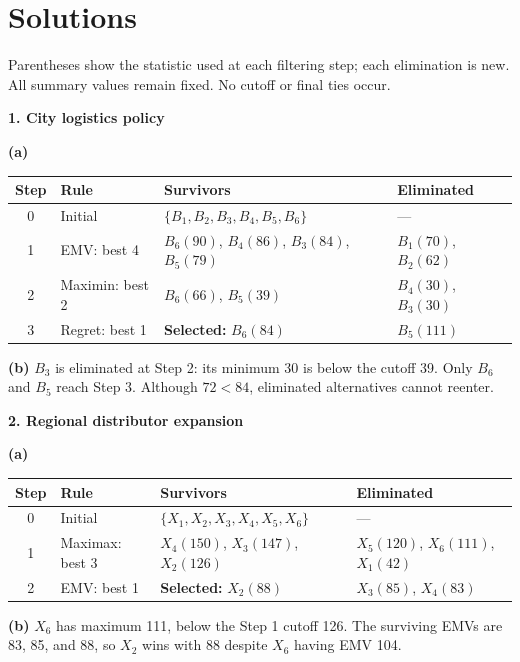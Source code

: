 \section*{Solutions}
Parentheses show the statistic used at each filtering step; each elimination is new.
All summary values remain fixed. No cutoff or final ties occur.


\begin{studentproblem}
\textbf{1. City logistics policy}\par
\textbf{(a)}
\begin{center}
\small
\begin{tabularx}{\textwidth}{@{}c >{\raggedright\arraybackslash}X >{\raggedright\arraybackslash}p{} >{\raggedright\arraybackslash}p{}@{}}
\toprule
Step & Rule & Survivors & Eliminated \\
\midrule
0 & Initial & $\{B_1,B_2,B_3,B_4,B_5,B_6\}$ & --- \\
1 & EMV: best 4 & $B_6(90)$, $B_4(86)$, $B_3(84)$, $B_5(79)$ & $B_1(70)$, $B_2(62)$ \\
2 & Maximin: best 2 & $B_6(66)$, $B_5(39)$ & $B_4(30)$, $B_3(30)$ \\
3 & Regret: best 1 & \textbf{Selected:} $B_6(84)$ & $B_5(111)$ \\
\bottomrule
\end{tabularx}
\end{center}
\textbf{(b)} $B_3$ is eliminated at Step 2: its minimum 30 is below the cutoff 39. Only $B_6$ and $B_5$ reach Step 3. Although $72<84$, eliminated alternatives cannot reenter.
\end{studentproblem}

\begin{studentproblem}
\textbf{2. Regional distributor expansion}\par
\textbf{(a)}
\begin{center}
\small
\begin{tabularx}{\textwidth}{@{}c >{\raggedright\arraybackslash}X >{\raggedright\arraybackslash}p{} >{\raggedright\arraybackslash}p{}@{}}
\toprule
Step & Rule & Survivors & Eliminated \\
\midrule
0 & Initial & $\{X_1,X_2,X_3,X_4,X_5,X_6\}$ & --- \\
1 & Maximax: best 3 & $X_4(150)$, $X_3(147)$, $X_2(126)$ & $X_5(120)$, $X_6(111)$, $X_1(42)$ \\
2 & EMV: best 1 & \textbf{Selected:} $X_2(88)$ & $X_3(85)$, $X_4(83)$ \\
\bottomrule
\end{tabularx}
\end{center}
\textbf{(b)} $X_6$ has maximum 111, below the Step 1 cutoff 126. The surviving EMVs are 83, 85, and 88, so $X_2$ wins with 88 despite $X_6$ having EMV 104.
\end{studentproblem}

